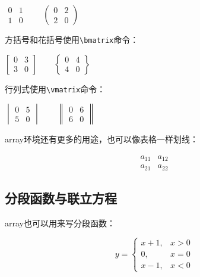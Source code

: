 {\begin{codeshow}
\centering $\begin{matrix}
0 & 1 \\ 1 & 0 \end{matrix}\qquad
\begin{pmatrix} 0 & 2 \\
2 & 0 \end{pmatrix}$
\end{codeshow}

方括号和花括号使用\verb|\bmatrix|命令：

\begin{codeshow}
\centering $\begin{bmatrix}
0 & 3 \\ 3 & 0 \end{bmatrix}\qquad
\begin{Bmatrix} 0 & 4 \\
4 & 0 \end{Bmatrix}$
\end{codeshow}

行列式使用\verb|\vmatrix|命令：

\begin{codeshow}
\centering $\begin{vmatrix}
0 & 5 \\ 5 & 0 \end{vmatrix}\qquad
\begin{Vmatrix} 0 & 6 \\
6 & 0 \end{Vmatrix}$
\end{codeshow}

array环境还有更多的用途，也可以像表格一样划线：

\begin{codeshow}
\[\begin{array}{c|c}
  a_{11} & a_{12} \\
  \hline
  a_{21} & a_{22}
  \end{array}\]
\end{codeshow}

\subsection{分段函数与联立方程}
array也可以用来写分段函数：

\begin{codeshow}
\[y=\left\{\begin{array}{ll}
x+1, & x>0 \\
0,   & x=0 \\
x-1, & x<0
\end{array}\right.\]
\end{codeshow}

}
